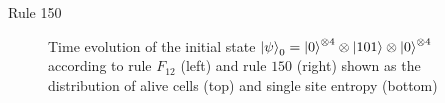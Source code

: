 \documentclass[aspectratio=169]{beamer}
\begin{document}
\begin{frame}[t]{Rule 150}
{\begin{figure}
\begin{columns}
    \end{columns}
    \caption{Time evolution of the initial state $\ket{\psi}_0=\ket{0}^{\otimes4}\otimes\ket{101}\otimes\ket{0}^{\otimes4}$ according to rule $F_{12}$ (left) and rule $150$ (right) shown as the distribution of alive cells (top) and single site entropy (bottom)}
    \end{figure}
    }%
\end{frame}
\end{document}
